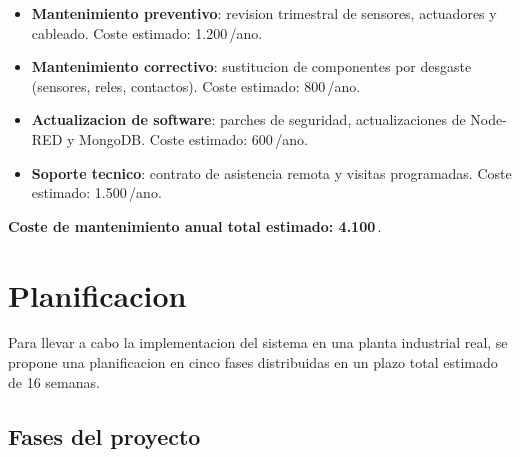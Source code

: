 \begin{itemize}
    \item \textbf{Mantenimiento preventivo}: revision trimestral de sensores, actuadores y cableado. Coste estimado: 1.200\,\texteuro{}/ano.
    \item \textbf{Mantenimiento correctivo}: sustitucion de componentes por desgaste (sensores, reles, contactos). Coste estimado: 800\,\texteuro{}/ano.
    \item \textbf{Actualizacion de software}: parches de seguridad, actualizaciones de Node-RED y MongoDB. Coste estimado: 600\,\texteuro{}/ano.
    \item \textbf{Soporte tecnico}: contrato de asistencia remota y visitas programadas. Coste estimado: 1.500\,\texteuro{}/ano.
\end{itemize}

\textbf{Coste de mantenimiento anual total estimado: 4.100\,\texteuro{}}.


\section{Planificacion}

Para llevar a cabo la implementacion del sistema en una planta industrial real, se propone una planificacion en cinco fases distribuidas en un plazo total estimado de 16 semanas.

\subsection{Fases del proyecto}

